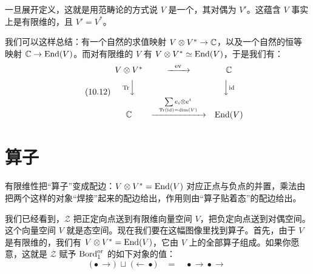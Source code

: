 
一旦展开定义，这就是用范畴论的方式说 $V$ 是一个，其对偶为 $V'$。这蕴含 $V$ 事实上是有限维的，且 $V'=V^{*}$。

我们可以这样总结：有一个自然的求值映射 $V\otimes V^{*}\to\mathbb{C}$，以及一个自然的恒等映射 $\mathbb{C}\to\mathrm{End}(V)$。而对有限维的 $V$ 有 $V\otimes V^{*}\simeq\mathrm{End}(V)$，于是我们有：
\begin{equation}\tag{10.12}
\begin{array}{ccc}
V\otimes V^{*} & \xrightarrow{\ \ \mathrm{ev}\ \ } & \C\\[5pt]
{\scriptstyle \mathrm{Tr}}\Big\downarrow & & \Big\downarrow{\scriptstyle \mathrm{id}}\\[5pt]
\C & \xrightarrow{\ \ \underset{\mathrm{Tr}(\mathrm{id})=\dim(V)}{\sum e_i\otimes e^i}\ \ } & \End(V)
\end{array}
\end{equation}


\section{算子}\label{sec:10-2}

\begin{sectionkey}
有限维性把“算子”变成配边：$V\otimes V^{*}=\mathrm{End}(V)$ 对应正点与负点的并置，乘法由把两个这样的对象“焊接”起来的配边给出，作用则由“算子贴着态”的配边给出。
\end{sectionkey}

我们已经看到，$\mathcal{Z}$ 把正定向点送到有限维向量空间 $V$，把负定向点送到对偶空间。这个向量空间 $V$ 就是态空间。现在我们要在这幅图像里找到算子。首先，由于 $V$ 是有限维的，我们有 $V\otimes V^{*}=\mathrm{End}(V)$，它由 $V$ 上的全部算子组成。如果你愿意，这就是 $\mathcal{Z}$ 赋予 $\mathrm{Bord}_1^{\mathrm{or}}$ 的如下对象的值：
\begin{equation}\tag{10.13}
\big(\bullet\!\!\longrightarrow\big)\;\sqcup\;\big(\longleftarrow\!\!\bullet\big)\quad=\quad\bullet\!\!\longrightarrow\!\!\bullet\!\!\longrightarrow
\end{equation}

